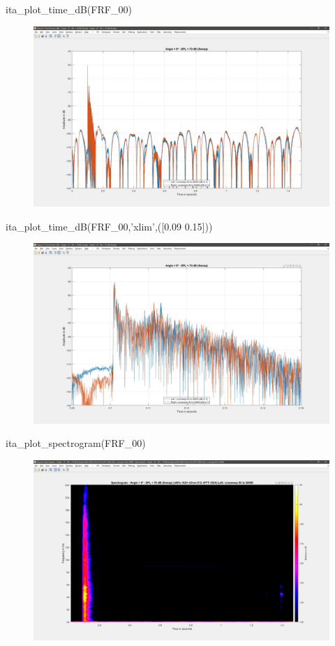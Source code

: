 \documentclass[12pt, a4paper, twoside, onecolumn]{article}%
\begin{document}
\begin{matlabbox}
ita_plot_time_dB(FRF_00)
\end{matlabbox}
\begin{figure}[H] \centering
\includegraphics[width=.7\textwidth]{Figures/E8.jpg}
\end{figure}
\pagebreak
\begin{matlabbox}
ita_plot_time_dB(FRF_00,'xlim',([0.09 0.15]))

\end{matlabbox}
\begin{figure}[H] \centering
\includegraphics[width=.7\textwidth]{Figures/E9.jpg}
\end{figure}
\begin{matlabbox}
ita_plot_spectrogram(FRF_00)
\end{matlabbox}
\begin{figure}[H] \centering
\includegraphics[width=.7\textwidth]{Figures/E10.jpg}
\end{figure}
\end{document}
